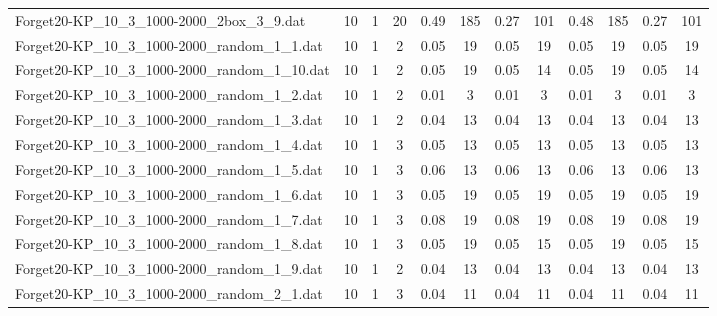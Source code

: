 \begin{sidewaystable}[!ht]
{\begin{tabular}{lccccccccccc}
Forget20-KP\_10\_3\_1000-2000\_2box\_3\_9.dat & 10 & 1 & 20 & 0.49 & 185 &  \textcolor{blue2}{0.27} & 101 & 0.48 & 185 &  \textcolor{blue2}{0.27} & 101 \\
Forget20-KP\_10\_3\_1000-2000\_random\_1\_1.dat & 10 & 1 & 2 &  \textcolor{blue2}{0.05} & 19 &  \textcolor{blue2}{0.05} & 19 &  \textcolor{blue2}{0.05} & 19 &  \textcolor{blue2}{0.05} & 19 \\
Forget20-KP\_10\_3\_1000-2000\_random\_1\_10.dat & 10 & 1 & 2 &  \textcolor{blue2}{0.05} & 19 &  \textcolor{blue2}{0.05} & 14 &  \textcolor{blue2}{0.05} & 19 &  \textcolor{blue2}{0.05} & 14 \\
Forget20-KP\_10\_3\_1000-2000\_random\_1\_2.dat & 10 & 1 & 2 &  \textcolor{blue2}{0.01} & 3 &  \textcolor{blue2}{0.01} & 3 &  \textcolor{blue2}{0.01} & 3 &  \textcolor{blue2}{0.01} & 3 \\
Forget20-KP\_10\_3\_1000-2000\_random\_1\_3.dat & 10 & 1 & 2 &  \textcolor{blue2}{0.04} & 13 &  \textcolor{blue2}{0.04} & 13 &  \textcolor{blue2}{0.04} & 13 &  \textcolor{blue2}{0.04} & 13 \\
Forget20-KP\_10\_3\_1000-2000\_random\_1\_4.dat & 10 & 1 & 3 &  \textcolor{blue2}{0.05} & 13 &  \textcolor{blue2}{0.05} & 13 &  \textcolor{blue2}{0.05} & 13 &  \textcolor{blue2}{0.05} & 13 \\
Forget20-KP\_10\_3\_1000-2000\_random\_1\_5.dat & 10 & 1 & 3 &  \textcolor{blue2}{0.06} & 13 &  \textcolor{blue2}{0.06} & 13 &  \textcolor{blue2}{0.06} & 13 &  \textcolor{blue2}{0.06} & 13 \\
Forget20-KP\_10\_3\_1000-2000\_random\_1\_6.dat & 10 & 1 & 3 &  \textcolor{blue2}{0.05} & 19 &  \textcolor{blue2}{0.05} & 19 &  \textcolor{blue2}{0.05} & 19 &  \textcolor{blue2}{0.05} & 19 \\
Forget20-KP\_10\_3\_1000-2000\_random\_1\_7.dat & 10 & 1 & 3 &  \textcolor{blue2}{0.08} & 19 &  \textcolor{blue2}{0.08} & 19 &  \textcolor{blue2}{0.08} & 19 &  \textcolor{blue2}{0.08} & 19 \\
Forget20-KP\_10\_3\_1000-2000\_random\_1\_8.dat & 10 & 1 & 3 &  \textcolor{blue2}{0.05} & 19 &  \textcolor{blue2}{0.05} & 15 &  \textcolor{blue2}{0.05} & 19 &  \textcolor{blue2}{0.05} & 15 \\
Forget20-KP\_10\_3\_1000-2000\_random\_1\_9.dat & 10 & 1 & 2 &  \textcolor{blue2}{0.04} & 13 &  \textcolor{blue2}{0.04} & 13 &  \textcolor{blue2}{0.04} & 13 &  \textcolor{blue2}{0.04} & 13 \\
Forget20-KP\_10\_3\_1000-2000\_random\_2\_1.dat & 10 & 1 & 3 &  \textcolor{blue2}{0.04} & 11 &  \textcolor{blue2}{0.04} & 11 &  \textcolor{blue2}{0.04} & 11 &  \textcolor{blue2}{0.04} & 11 \\

\end{tabular}}
\end{sidewaystable}
